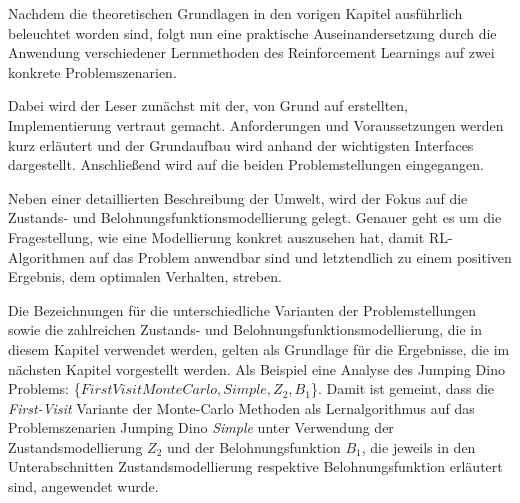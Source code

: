 Nachdem die theoretischen Grundlagen in den vorigen Kapitel ausführlich beleuchtet worden sind, folgt nun eine praktische Auseinandersetzung durch die Anwendung verschiedener Lernmethoden des Reinforcement Learnings auf zwei konkrete Problemszenarien. 
\par 
Dabei wird der Leser zunächst mit der, von Grund auf erstellten, Implementierung vertraut gemacht. Anforderungen und Voraussetzungen werden kurz erläutert und der Grundaufbau wird anhand der wichtigsten Interfaces dargestellt. Anschließend wird auf die beiden Problemstellungen eingegangen. 
\par 
Neben einer detaillierten Beschreibung der Umwelt, wird der Fokus auf die Zustands- und Belohnungsfunktionsmodellierung gelegt. Genauer geht es um die Fragestellung, wie eine Modellierung konkret auszusehen hat, damit RL-Algorithmen auf das Problem anwendbar sind und letztendlich zu einem positiven Ergebnis, dem optimalen Verhalten, streben.
\par
Die Bezeichnungen für die unterschiedliche Varianten der Problemstellungen sowie die zahlreichen Zustands- und Belohnungsfunktionsmodellierung, die in diesem Kapitel verwendet werden, gelten als Grundlage für die Ergebnisse, die im nächsten Kapitel vorgestellt werden. Als Beispiel eine Analyse des Jumping Dino Problems: \{$FirstVisitMonteCarlo,Simple, Z_2, B_1$\}. Damit ist gemeint, dass die \textit{First-Visit }Variante der Monte-Carlo Methoden als Lernalgorithmus auf das Problemszenarien Jumping Dino \textit{Simple} unter Verwendung der Zustandsmodellierung $Z_2$ und der Belohnungsfunktion $B_1$, die jeweils in den Unterabschnitten \glqq Zustandsmodellierung\grqq{} respektive \glqq Belohnungsfunktion\grqq{} erläutert sind, angewendet wurde.
